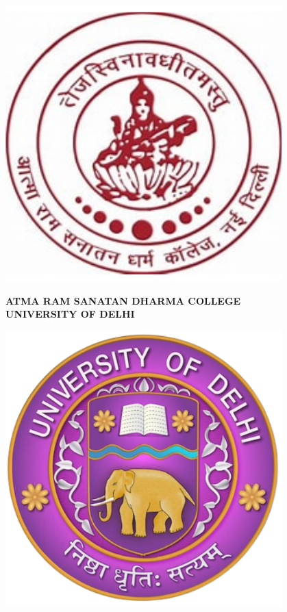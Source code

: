 \begin{titlepage}
    \centering
    \begin{minipage}{0.24\textwidth}
        \centering
        \includegraphics[width=0.8\textwidth]{miscellaneous/arsd_logo.png} %
    \end{minipage}%
    \hfill
    \begin{minipage}{0.4\textwidth}
        \centering
        {\large \textbf{ATMA RAM SANATAN DHARMA COLLEGE}} \\
        {\large \textbf{UNIVERSITY OF DELHI}} 
    \end{minipage}%
    \hfill
    \begin{minipage}{0.24\textwidth}
        \centering
        \includegraphics[width=0.8\textwidth]{miscellaneous/du_logo.png} %
    \end{minipage}


\end{titlepage}
